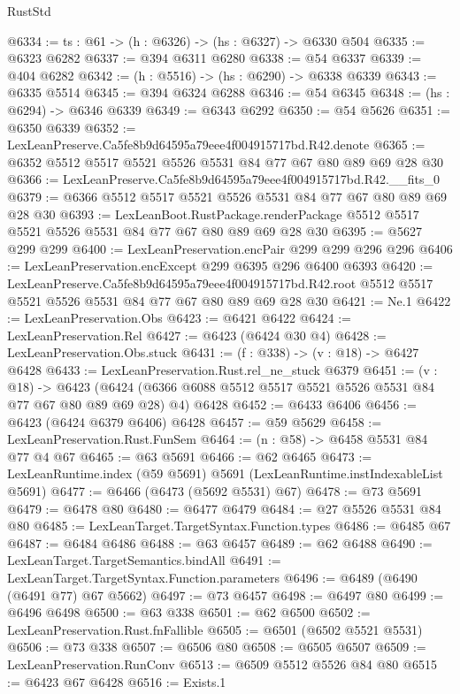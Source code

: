 \begin{lexlean}{RustStd}
\begin{coremodule}
@6334 := {ts : @61} -> (h : @6326) -> (hs : @6327) -> @6330 @504
@6335 := @6323 @6282
@6337 := @394 @6311 @6280
@6338 := @54 @6337
@6339 := @404 @6282
@6342 := (h : @5516) -> (hs : @6290) -> @6338 @6339
@6343 := @6335 @5514
@6345 := @394 @6324 @6288
@6346 := @54 @6345
@6348 := (hs : @6294) -> @6346 @6339
@6349 := @6343 @6292
@6350 := @54 @5626
@6351 := @6350 @6339
@6352 := LexLeanPreserve.Ca5fe8b9d64595a79eee4f004915717bd.R42.denote
@6365 := @6352 @5512 @5517 @5521 @5526 @5531 @84 @77 @67 @80 @89 @69 @28 @30
@6366 := LexLeanPreserve.Ca5fe8b9d64595a79eee4f004915717bd.R42.__fits_0
@6379 := @6366 @5512 @5517 @5521 @5526 @5531 @84 @77 @67 @80 @89 @69 @28 @30
@6393 := LexLeanBoot.RustPackage.renderPackage
    @5512
    @5517
    @5521
    @5526
    @5531
    @84
    @77
    @67
    @80
    @89
    @69
    @28
    @30
@6395 := @5627 @299 @299
@6400 := LexLeanPreservation.encPair @299 @299 @296 @296
@6406 := LexLeanPreservation.encExcept @299 @6395 @296 @6400 @6393
@6420 := LexLeanPreserve.Ca5fe8b9d64595a79eee4f004915717bd.R42.root
    @5512
    @5517
    @5521
    @5526
    @5531
    @84
    @77
    @67
    @80
    @89
    @69
    @28
    @30
@6421 := Ne.{1}
@6422 := LexLeanPreservation.Obs
@6423 := @6421 @6422
@6424 := LexLeanPreservation.Rel
@6427 := @6423 (@6424 @30 @4)
@6428 := LexLeanPreservation.Obs.stuck
@6431 := (f : @338) -> (v : @18) -> @6427 @6428
@6433 := LexLeanPreservation.Rust.rel_ne_stuck @6379
@6451 := (v : @18) ->
  @6423 (@6424 (@6366 @6088 @5512 @5517 @5521 @5526 @5531 @84 @77 @67 @80 @89 @69 @28) @4) @6428
@6452 := @6433 @6406
@6456 := @6423 (@6424 @6379 @6406) @6428
@6457 := @59 @5629
@6458 := LexLeanPreservation.Rust.FunSem
@6464 := (n : @58) -> @6458 @5531 @84 @77 @4 @67
@6465 := @63 @5691
@6466 := @62 @6465
@6473 := LexLeanRuntime.index (@59 @5691) @5691 (LexLeanRuntime.instIndexableList @5691)
@6477 := @6466 (@6473 (@5692 @5531) @67)
@6478 := @73 @5691
@6479 := @6478 @80
@6480 := @6477 @6479
@6484 := @27 @5526 @5531 @84 @80
@6485 := LexLeanTarget.TargetSyntax.Function.types
@6486 := @6485 @67
@6487 := @6484 @6486
@6488 := @63 @6457
@6489 := @62 @6488
@6490 := LexLeanTarget.TargetSemantics.bindAll
@6491 := LexLeanTarget.TargetSyntax.Function.parameters
@6496 := @6489 (@6490 (@6491 @77) @67 @5662)
@6497 := @73 @6457
@6498 := @6497 @80
@6499 := @6496 @6498
@6500 := @63 @338
@6501 := @62 @6500
@6502 := LexLeanPreservation.Rust.fnFallible
@6505 := @6501 (@6502 @5521 @5531)
@6506 := @73 @338
@6507 := @6506 @80
@6508 := @6505 @6507
@6509 := LexLeanPreservation.RunConv
@6513 := @6509 @5512 @5526 @84 @80
@6515 := @6423 @67 @6428
@6516 := Exists.{1}

\end{coremodule}
\end{lexlean}
